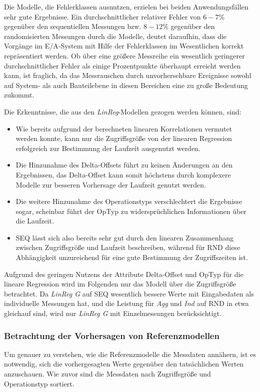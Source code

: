 \documentclass[
	twoside,
	12pt,
	a4paper,
	BCOR10mm,
	DIV14,
	listof=totoc,
	bibliography=totoc,
	headsepline
]{scrreprt}
\begin{document}
Die Modelle, die Fehlerklassen ausnutzen, erzielen bei beiden Anwendungsfällen sehr gute Ergebnisse.
Ein durchschnittlicher relativer Fehler von $6-7\%$ gegenüber den sequentiellen Messungen bzw. $8-12\%$ gegenüber den randomisierten Messungen durch die Modelle, deutet daraufhin, dass die Vorgänge im E/A-System mit Hilfe der Fehlerklassen im Wesentlichen korrekt repräsentiert werden.
Ob über eine größere Messreihe ein wesentlich geringerer durchschnittlicher Fehler als einige Prozentpunkte überhaupt erreicht werden kann, ist fraglich, da das Messrauschen durch unvorhersehbare Ereignisse sowohl auf System- als auch Bauteilebene in diesen Bereichen eine zu große Bedeutung zukommt. \medskip
 
Die Erkenntnisse, die aus den \textit{LinReg}-Modellen gezogen werden können, sind:
\begin{itemize}
	\item Wie bereits aufgrund der berechneten linearen Korrelationen vermutet werden konnte, kann nur die Zugriffsgröße von der linearen Regression erfolgreich zur Bestimmung der Laufzeit ausgenutzt werden.
	\item Die Hinzunahme des Delta-Offsets führt zu keinen Änderungen an den Ergebnissen, das Delta-Offset kann somit höchstens durch komplexere Modelle zur besseren Vorhersage der Laufzeit genutzt werden.
	\item Die weitere Hinzunahme des Operationstyps verschlechtert die Ergebnisse sogar, scheinbar führt der OpTyp zu widersprüchlichen Informationen über die Laufzeit.	
	\item SEQ lässt sich also bereits sehr gut durch den linearen Zusammenhang zwischen Zugriffsgröße und Laufzeit beschreiben, während für RND diese Abhängigkeit unzureichend für eine gute Bestimmung der Zugriffszeiten ist.
\end{itemize}
 
Aufgrund des geringen Nutzens der Attribute Delta-Offset und OpTyp für die lineare Regression wird im Folgenden nur das Modell über die Zugriffsgröße betrachtet.
Da \textit{LinReg G} auf SEQ wesentlich bessere Werte mit Eingabedaten als individuelle Messungen hat, und die Leistung für \textit{Agg} und \textit{Ind} auf RND in etwa gleichauf sind, wird nur \textit{LinReg G} mit Einzelmessungen berücksichtigt.\\

\subsubsection{Betrachtung der Vorhersagen von Referenzmodellen}
Um genauer zu verstehen, wie die Referenzmodelle die Messdaten annähern, ist es notwendig, sich die vorhergesagten Werte gegenüber den tatsächlichen Werten anzuschauen.
Wie zuvor sind die Messdaten nach Zugriffsgröße und Operationstyp sortiert.\medskip
\end{document}
